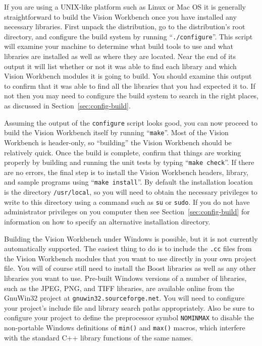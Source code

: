 If you are using a UNIX-like platform such as Linux or Mac OS it is
generally straightforward to build the Vision Workbench once you have
installed any necessary libraries.  First unpack the distribution, go
to the distribution's root directory, and configure the build system
by running ``\verb#./configure#''.  This script will examine your machine
to determine what build tools to use and what libraries are installed
as well as where they are located.  Near the end of its output it will
list whether or not it was able to find each library and which Vision
Workbench modules it is going to build.  You should examine this
output to confirm that it was able to find all the libraries that you
had expected it to.  If not then you may need to configure the build
system to search in the right places, as discussed in
Section~\ref{sec:config-build}.

Assuming the output of the \verb#configure# script looks good, you can
now proceed to build the Vision Workbench itself by running
``\verb#make#''.  Most of the Vision Workbench is header-only, so
``building'' the Vision Workbench should be relatively quick.  Once
the build is complete, confirm that things are working properly by
building and running the unit tests by typing ``\verb#make check#''.
If there are no errors, the final step is to install the Vision
Workbench headers, library, and sample programs using
``\verb#make install#''.  By default the installation location is the
directory \verb#/usr/local#, so you will need to obtain the necessary
privileges to write to this directory using a command such as
\verb#su# or \verb#sudo#.  If you do not have administrator privileges
on you computer then see Section~\ref{sec:config-build} for
information on how to specify an alternative installation directory.

Building the Vision Workbench under Windows is possible, but it is not
currently automatically supported.  The easiest thing to do is to
include the \verb#.cc# files from the Vision Workbench modules that
you want to use directly in your own project file.  You will of course
still need to install the Boost libraries as well as any other
libraries you want to use.  Pre-built Windows versions of a number of
libraries, such as the JPEG, PNG, and TIFF libraries, are available
online from the GnuWin32 project at \verb#gnuwin32.sourceforge.net#.
You will need to configure your project's include file and library
search paths appropriately.  Also be sure to configure your project to
define the preprocessor symbol \verb#NOMINMAX# to disable the
non-portable Windows definitions of \verb#min()# and \verb#max()#
macros, which interfere with the standard C++ library functions of the
same names.

